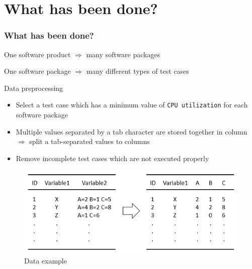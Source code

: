 \documentclass{beamer}
\begin{document}


\section{What has been done?}

\begin{frame}
\frametitle{What has been done?}
One software product $\Rightarrow$ many software packages
	
One software package $\Rightarrow$ many different types of test cases

\vspace{3mm}

Data preprocessing 

\begin{itemize}
	\item Select a test case which has a minimum value of \texttt{CPU utilization} for each software package
	\item Multiple values separated by a tab character are stored together in column $\Rightarrow$ split a tab-separated values to columns
	\item Remove incomplete test cases which are not executed properly 
	
\end{itemize}
	
\begin{figure}
	\includegraphics[width=0.55\linewidth]{table4}
	\caption{Data example}
\end{figure}

\end{frame}
\end{document}
